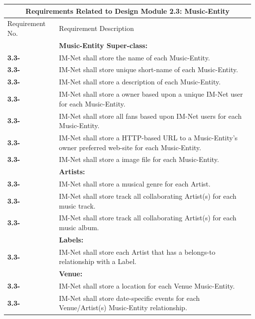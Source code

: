 \documentclass[letterpaper,12pt]{article}
\newcounter{rcounter}							%
\newcommand\rnumber{\stepcounter{rcounter}\arabic{rcounter}}
\begin{document}
{\setcounter{rcounter}{0}
\begin{center}
\begin{tabular}{|l|p{6in}|}
\hline 
\multicolumn{2}{|c|}{\textbf{Requirements Related to Design Module 2.3: Music-Entity}} \\ 
\hline 
Requirement No. & Requirement Description \\ 
\hline
& \textbf{Music-Entity Super-class:} \\
\hline
\textbf{3.3-\rnumber} & IM-Net shall store the name of each Music-Entity. \\ 
\hline
\textbf{3.3-\rnumber} & IM-Net shall store unique short-name of each Music-Entity. \\ 
\hline 
\textbf{3.3-\rnumber} & IM-Net shall store a description of each Music-Entity. \\ 
\hline 
\textbf{3.3-\rnumber} & IM-Net shall store a owner based upon a unique IM-Net user for each Music-Entity. \\ 
\hline 
\textbf{3.3-\rnumber} & IM-Net shall store all fans based upon IM-Net users for each Music-Entity. \\ 
\hline 
\textbf{3.3-\rnumber} & IM-Net shall store a HTTP-based URL to a Music-Entity's owner preferred web-site for each Music-Entity. \\ 
\hline
\textbf{3.3-\rnumber} & IM-Net shall store a image file for each Music-Entity. \\ 
\hline
& \textbf{Artists:} \\
\hline
\textbf{3.3-\rnumber} & IM-Net shall store a musical genre for each Artist. \\ 
\hline 
\textbf{3.3-\rnumber} & IM-Net shall store track all collaborating Artist(s) for each music track. \\ 
\hline
\textbf{3.3-\rnumber} & IM-Net shall store track all collaborating Artist(s) for each music album. \\ 
\hline
& \textbf{Labels:} \\
\hline
\textbf{3.3-\rnumber} & IM-Net shall store each Artist that has a belongs-to relationship with a Label. \\ 
\hline 
& \textbf{Venue:} \\
\hline
\textbf{3.3-\rnumber} & IM-Net shall store a location for each Venue Music-Entity. \\ 
\hline 
\textbf{3.3-\rnumber} & IM-Net shall store date-specific events for each Venue/Artist(s) Music-Entity relationship. \\ 
\hline


\end{tabular}
\end{center}}
\end{document}
